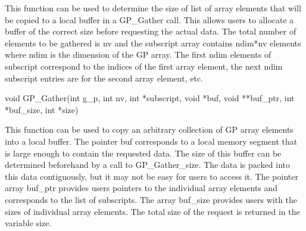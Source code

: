 \documentclass[12pt]{article}
\begin{document}
\ncoll

\begin{desc}

This function can be used to determine the size of list of array elements that
will be copied to a local buffer in a GP\_Gather call. This allows users to
allocate a buffer of the correct size before requesting the actual data. The
total number of elements to be gathered is nv and the
subscript array contains ndim*nv elements where ndim is the dimension of the GP
array. The first ndim elements of subscript correspond to the indices of the first
array element, the next ndim subscript entries are for the second array element,
etc.

\end{desc}



\begin{capi}
\begin{ccode}
void GP_Gather(int g_p, int nv, int *subscript, void *buf,
               void **buf_ptr, int *buf_size, int *size)
\end{ccode}
\begin{funcargs}
\end{funcargs}
\end{capi}

\ncoll

\begin{desc}

This function can be used to copy an arbitrary collection of GP array elements
into a local buffer. The pointer buf corresponds to a local memory segment that
is large enough to contain the requested data. The size of this buffer can be
determined beforehand by a call to GP\_Gather\_size. The data is packed into
this data contiguously, but it may not be easy for users to access it. The
pointer array buf\_ptr provides users pointers to the individual array elements
and corresponds to the list of subscripts. The array buf\_size provides users
with the sizes of individual array elements. The total size of the request is
returned in the variable size.

\end{desc}
\end{document}
